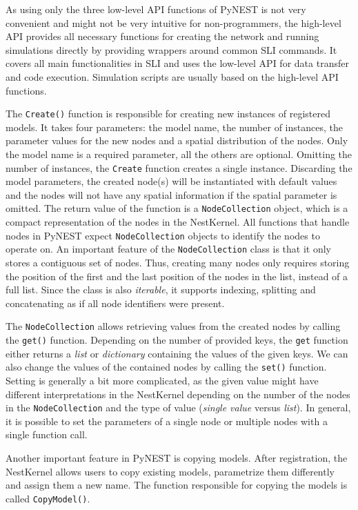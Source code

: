 As using only the three low-level API functions of PyNEST is not very convenient and might not be very intuitive for non-programmers, the high-level API provides all necessary functions for creating the network and running simulations directly by providing wrappers around common SLI commands. It covers all main functionalities in SLI and uses the low-level API for data transfer and code execution. Simulation scripts are usually based on the high-level API functions.

The \texttt{Create()} function is responsible for creating new instances of registered models. It takes four parameters: the model name, the number of instances, the parameter values for the new nodes and a spatial distribution of the nodes. Only the model name is a required parameter, all the others are optional. Omitting the number of instances, the \texttt{Create} function creates a single instance. Discarding the model parameters, the created node(s) will be instantiated with default values and the nodes will not have any spatial information if the spatial parameter is omitted. The return value of the function is a \texttt{NodeCollection} object, which is a compact representation of the nodes in the NestKernel. All functions that handle nodes in PyNEST expect \texttt{NodeCollection} objects to identify the nodes to operate on. An important feature of the \texttt{NodeCollection} class is that it only stores a contiguous set of nodes. Thus, creating many nodes only requires storing the position of the first and the last position of the nodes in the list, instead of a full list. Since the class is also \emph{iterable}, it supports indexing, splitting and concatenating as if all node identifiers were present.

The \texttt{NodeCollection} allows retrieving values from the created nodes by calling the \texttt{get()} function. Depending on the number of provided keys, the \texttt{get} function either returns a \emph{list} or \emph{dictionary} containing the values of the given keys. We can also change the values of the contained nodes by calling the \texttt{set()} function. Setting is generally a bit more complicated, as the given value might have different interpretations in the NestKernel depending on the number of the nodes in the \texttt{NodeCollection} and the type of value (\emph{single value} versus \emph{list}). In general, it is possible to set the parameters of a single node or multiple nodes with a single function call.

Another important feature in PyNEST is copying models. After registration, the NestKernel allows users to copy existing models, parametrize them differently and assign them a new name. The function responsible for copying the models is called \texttt{CopyModel()}.

